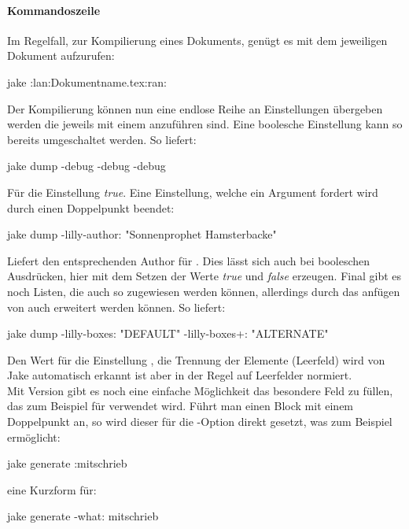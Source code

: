 \paragraph{Kommandoszeile}
Im Regelfall, zur Kompilierung eines Dokuments, genügt es \Jake mit dem jeweiligen Dokument aufzurufen:
\begin{bash*}
jake :lan:Dokumentname.tex:ran:
\end{bash*}
Der Kompilierung können nun eine endlose Reihe an Einstellungen übergeben werden die jeweils mit einem \say{\T{-}} anzuführen sind. Eine boolesche Einstellung kann so bereits umgeschaltet werden. So liefert:
\begin{bash*}
jake dump -debug -debug -debug
\end{bash*}
Für die Einstellung  \emph{true}. Eine  Einstellung, welche ein Argument fordert wird durch einen Doppelpunkt beendet:
\begin{bash*}
jake dump -lilly-author: "Sonnenprophet Hamsterbacke"
\end{bash*}
Liefert den entsprechenden Author für . Dies lässt sich auch bei booleschen Ausdrücken, hier mit dem Setzen der Werte \emph{true} und \emph{false} erzeugen. Final gibt es noch Listen, die auch so zugewiesen werden können, allerdings durch das anfügen von \T{+:} auch erweitert werden können. So liefert:
\begin{bash*}
jake dump -lilly-boxes: "DEFAULT" -lilly-boxes+: "ALTERNATE"
\end{bash*}
Den Wert  für die Einstellung , die Trennung der Elemente (Leerfeld) wird von Jake automatisch erkannt ist aber in der Regel auf Leerfelder normiert.\\
Mit Version  gibt es noch eine einfache Möglichkeit das besondere Feld  zu füllen, das zum Beispiel für  verwendet wird.
Führt man einen Block mit einem Doppelpunkt an, so wird dieser für die -Option direkt gesetzt, was zum Beispiel ermöglicht:
\begin{bash*}
jake generate :mitschrieb
\end{bash*}
eine Kurzform für:
\begin{bash*}
jake generate -what: mitschrieb
\end{bash*}
